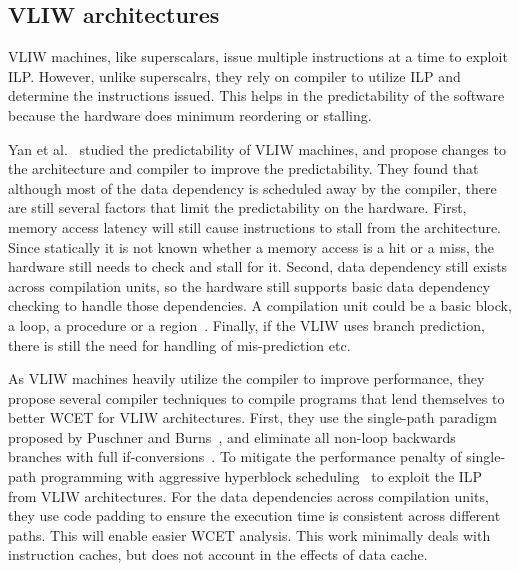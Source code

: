 
\subsection{VLIW architectures}
\label{sec:RTVLIW}
VLIW machines, like superscalars, issue multiple instructions at a time to exploit ILP.
However, unlike superscalrs, they rely on compiler to utilize ILP and determine the instructions issued.  
This helps in the predictability of the software because the hardware does minimum reordering or stalling.
 
Yan et al.~\cite{Yan2008VLIW} studied the predictability of VLIW machines, and propose changes to the architecture and compiler to improve the predictability. 
They found that although most of the data dependency is scheduled away by the compiler, there are still several factors that limit the predictability on the hardware. 
First, memory access latency will still cause instructions to stall from the architecture. 
Since statically it is not known whether a memory access is a hit or a miss, the hardware still needs to check and stall for it. 
Second, data dependency still exists across compilation units, so the hardware still supports basic data dependency checking to handle those dependencies.
A compilation unit could be a basic block, a loop, a procedure or a region~\cite{Hank:1995:RCI:225160.225189}. 
Finally, if the VLIW uses branch prediction, there is still the need for handling of mis-prediction etc.

As VLIW machines heavily utilize the compiler to improve performance, they propose several compiler techniques to compile programs that lend themselves to better WCET for VLIW architectures. 
First, they use the single-path paradigm proposed by Puschner and Burns~\cite{Puschner:2002:WTP:882515.885528}, and eliminate all non-loop backwards branches with full if-conversions~\cite{Allen:1983:CCD:567067.567085}.  
To mitigate the performance penalty of single-path programming with aggressive hyperblock scheduling~\cite{Mahlke:1992:ECS:144953.144998} to exploit the ILP from VLIW architectures. 
For the data dependencies across compilation units, they use code padding to ensure the execution time is consistent across different paths.    
This will enable easier WCET analysis. 
This work minimally deals with instruction caches, but does not account in the effects of data cache. 

